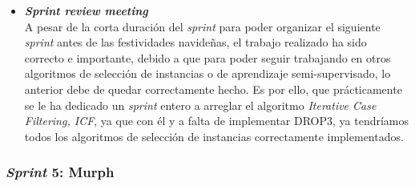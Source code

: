 \begin{itemize}
\item \textbf{\textit{Sprint review meeting}}\\
A pesar de la corta duración del \textit{sprint} para poder organizar el siguiente \textit{sprint} antes de las festividades navideñas, el trabajo realizado ha sido correcto e importante, debido a que para poder seguir trabajando en otros algoritmos de selección de instancias o de aprendizaje semi-supervisado, lo anterior debe de quedar correctamente hecho. Es por ello, que prácticamente se le ha dedicado un \textit{sprint} entero a arreglar el algoritmo \textit{Iterative Case Filtering, ICF}, ya que con él y a falta de implementar DROP3, ya tendríamos todos los algoritmos de selección de instancias correctamente implementados.
\end{itemize}
\vfill
\subsubsection{\textit{Sprint} 5: Murph}
